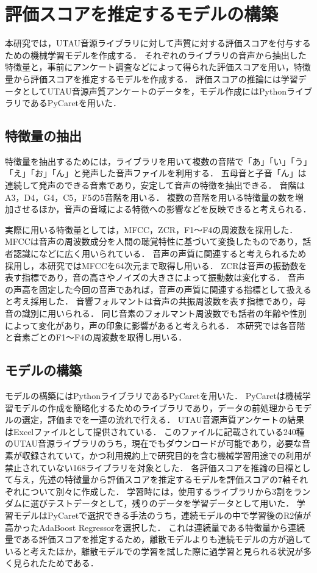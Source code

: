 \documentclass[a4j,8pt,twocolumn]{extarticle}
\begin{document}
\section{評価スコアを推定するモデルの構築}
本研究では，UTAU音源ライブラリに対して声質に対する評価スコアを付与するための機械学習モデルを作成する．
それぞれのライブラリの音声から抽出した特徴量と，事前にアンケート調査などによって得られた評価スコアを用い，特徴量から評価スコアを推定するモデルを作成する．
評価スコアの推論には学習データとしてUTAU音源声質アンケートのデータを，モデル作成にはPythonライブラリであるPyCaretを用いた．

\subsection{特徴量の抽出}
特徴量を抽出するためには，ライブラリを用いて複数の音階で「あ」「い」「う」「え」「お」「ん」と発声した音声ファイルを利用する．
五母音と子音「ん」は連続して発声のできる音素であり，安定して音声の特徴を抽出できる．
音階はA3，D4，G4，C5，F5の5音階を用いる．
複数の音階を用いる特徴量の数を増加させるほか，音声の音域による特徴への影響などを反映できると考えられる．

実際に用いる特徴量としては，MFCC，ZCR，F1〜F4の周波数を採用した．
MFCCは音声の周波数成分を人間の聴覚特性に基づいて変換したものであり，話者認識になどに広く用いられている．
音声の声質に関連すると考えられるため採用し，本研究ではMFCCを64次元まで取得し用いる．
ZCRは音声の振動数を表す指標であり，音の高さやノイズの大きさによって振動数は変化する．
音声の声高を固定した今回の音声であれば，音声の声質に関連する指標として扱えると考え採用した．
音響フォルマントは音声の共振周波数を表す指標であり，母音の識別に用いられる．
同じ音素のフォルマント周波数でも話者の年齢や性別によって変化があり\cite{formant}，声の印象に影響があると考えられる．
本研究では各音階と音素ごとのF1〜F4の周波数を取得し用いる．

\subsection{モデルの構築}
モデルの構築にはPythonライブラリであるPyCaretを用いた．
PyCaretは機械学習モデルの作成を簡略化するためのライブラリであり，データの前処理からモデルの選定，評価までを一連の流れで行える．
UTAU音源声質アンケートの結果はExcelファイルとして提供されている．
このファイルに記載されている240種のUTAU音源ライブラリのうち，現在でもダウンロードが可能であり，必要な音素が収録されていて，かつ利用規約上で研究目的を含む機械学習用途での利用が禁止されていない168ライブラリを対象とした．
各評価スコアを推論の目標として与え，先述の特徴量から評価スコアを推定するモデルを評価スコアの7軸それぞれについて別々に作成した．
学習時には，使用するライブラリから3割をランダムに選びテストデータとして，残りのデータを学習データとして用いた．
学習モデルはPyCaretで選択できる手法のうち，連続モデルの中で学習後のR2値が高かったAdaBoost Regressorを選択した．
これは連続量である特徴量から連続量である評価スコアを推定するため，離散モデルよりも連続モデルの方が適していると考えたほか，離散モデルでの学習を試した際に過学習と見られる状況が多く見られたためである．
\end{document}
